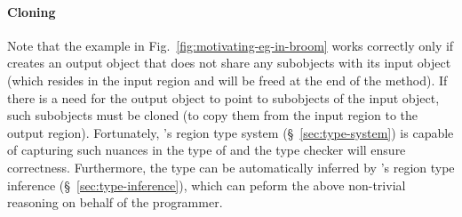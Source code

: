 \paragraph{Cloning}
Note that the example in Fig.~\ref{fig:motivating-eg-in-broom} works correctly only if 
creates an output object that does not share any subobjects with its input object (which resides in
the input region and will be freed at the end of the method).
If there is a need for the output object to point to subobjects of the input object, such subobjects
must be cloned (to copy them from the input region to the output region).
Fortunately, \name's region type system (\S~\ref{sec:type-system}) is
capable of capturing such nuances in the type of 
and the type checker will ensure correctness.
Furthermore, the type can be automatically inferred by \name's region type
inference (\S~\ref{sec:type-inference}), which can peform the above
non-trivial reasoning on behalf of the programmer.



